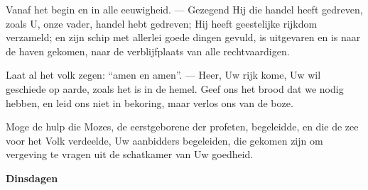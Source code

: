 \documentclass[12pt,twoside,a5paper]{article}
\newlength{\origparskip}
\newenvironment{halfparskip}{
  \setlength{\parskip}{0.5\origparskip}
}{
  \setlength{\parskip}{\origparskip}
}
\newcommand{\liturgicaloption}[1]{{\color{BrickRed}\textbf{#1}}}
\newcommand{\markedday}[1]{%
  \liturgicaloption{#1}%
  \markright{#1}%
}
\begin{document}
\begin{halfparskip}
  Vanaf het begin en in alle eeuwigheid. --- Gezegend Hij die handel heeft gedreven, zoals U, onze vader, handel hebt gedreven; Hij heeft geestelijke rijkdom verzameld; en zijn schip met allerlei goede dingen gevuld, is uitgevaren en is naar de haven gekomen, naar de verblijfplaats van alle rechtvaardigen.

  Laat al het volk zegen: ``amen en amen''. --- Heer, Uw rijk kome, Uw wil geschiede op aarde, zoals het is in de hemel. Geef ons het brood dat we nodig hebben, en leid ons niet in bekoring, maar verlos ons van de boze.

  Moge de hulp die Mozes, de eerstgeborene der profeten, begeleidde, en die de zee voor het Volk verdeelde, Uw aanbidders begeleiden, die gekomen zijn om vergeving te vragen uit de schatkamer van Uw goedheid.
\end{halfparskip}

\markedday{Dinsdagen}
\end{document}
